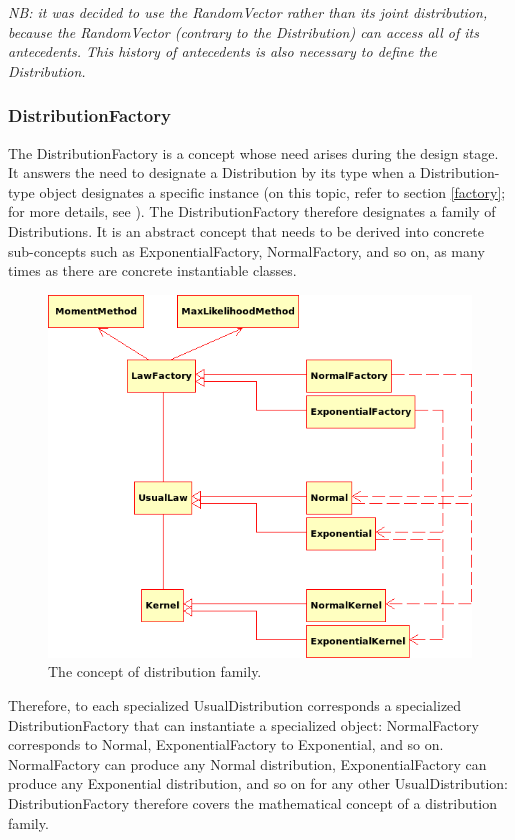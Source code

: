 \emph{NB: it was decided to use the RandomVector rather than its joint distribution, because the RandomVector (contrary to the Distribution) can access all of its antecedents. This history of antecedents is also necessary to define the Distribution.}

\subsubsection{DistributionFactory}

The DistributionFactory is a concept whose need arises during the design stage. It answers the need to designate a Distribution by its type when a Distribution-type object designates a specific instance (on this topic, refer to section \ref{factory}; for more details, see \cite{GoF}). The DistributionFactory therefore designates a family of Distributions. It is an abstract concept that needs to be derived into concrete sub-concepts such as ExponentialFactory, NormalFactory, and so on, as many times as there are concrete instantiable classes.

\begin{figure}[htb]
  \begin{center}
    \includegraphics[scale=0.7]{Figures/analysis/distribution_family.png}
    \caption{The concept of distribution family.}\label{fig:distribution_family}
  \end{center}
\end{figure}

Therefore, to each specialized UsualDistribution corresponds a specialized DistributionFactory that can instantiate a specialized object: NormalFactory corresponds to Normal, ExponentialFactory to Exponential, and so on. NormalFactory can produce any Normal distribution, ExponentialFactory can produce any Exponential distribution, and so on for any other UsualDistribution: DistributionFactory therefore covers the mathematical concept of a distribution family.


